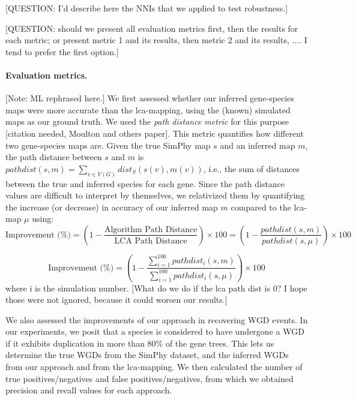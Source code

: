 \documentclass[10pt]{article}
\newcommand{\ml}[1]{\begingroup\color{blue}#1\endgroup}
\newcommand{\rk}[1]{\begingroup\color{red}#1\endgroup}
\begin{document}
\ml{[QUESTION: I'd describe here the NNIs that we applied to test robustness.]}




\ml{[QUESTION: should we present all evaluation metrics first, then the results for each metric; or present metric 1 and its results, then metric 2 and its results, ....  I tend to prefer the first option.]}

\paragraph{\ml{Evaluation metrics.}}  \ml{[Note: ML rephrased here.]}  We first assessed whether our inferred gene-species maps were more accurate than the lca-mapping, using the (known) simulated maps as our ground truth.  
We used the \emph{path distance metric} for this purpose \cite{moulton1999retractions} \ml{[citation needed, Moulton and others paper]}.
This metric quantifies how different two gene-species maps are.  Given the true SimPhy map $s$ and an inferred map $m$, the path distance between $s$ and $m$ is  
$pathdist(s, m) = \sum_{v \in V(G)} dist_S(s(v), m(v))$, i.e., the sum of distances between the true and inferred species for each gene.
Since the path distance values are difficult to interpret by themselves, we relativized them by quantifying the increase (or decrease) in accuracy of our inferred map $m$ compared to the lca-map $\mu$ using:
$$
\text{Improvement (\%)} = \left(1 - \frac{\text{Algorithm Path Distance}}{\text{LCA Path Distance}}\right) \times 100 = 
\left(1 - \frac{pathdist(s, m)}{pathdist(s, \mu)}\right) \times 100
$$

\rk{$$
\text{Improvement (\%)} = \left(1 - \frac{\sum_{i=1}^{100} pathdist_i(s, m)}{\sum_{i=1}^{100} pathdist_i(s, \mu)}\right) \times 100
$$}
\rk{where i is the simulation number.}
\ml{[What do we do if the lca path dist is $0$?  I hope those were not ignored, because it could worsen our results.]}

We also assessed the improvements of our approach in recovering WGD events. 
In our experiments, we posit that a species is considered to have undergone a WGD if it exhibits duplication in more than 80\% of the gene trees.  This lets us determine the true WGDs from the SimPhy dataset, and the inferred WGDs from our approach and from the lca-mapping.  We then calculated the number of true positives/negatives and false positives/negatives, from which we obtained precision and recall values for each approach.
\end{document}
